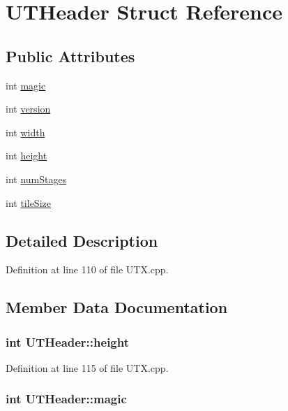 \hypertarget{struct_u_t_header}{
\section{UTHeader Struct Reference}
\label{struct_u_t_header}
}
\subsection*{Public Attributes}
\begin{CompactItemize}
\item 
int \hyperlink{struct_u_t_header_f6c9f55cec2e6ec94620e6e3fc24770e}{magic}
\item 
int \hyperlink{struct_u_t_header_8e3185b7f9941a663f06a879c8d0a0fa}{version}
\item 
int \hyperlink{struct_u_t_header_40fc887172fff3070cc65b89284fd6a2}{width}
\item 
int \hyperlink{struct_u_t_header_76a3dd533173f5658d6541778a633e8e}{height}
\item 
int \hyperlink{struct_u_t_header_59ad5aaff6083f0136dbe7d1875603d2}{numStages}
\item 
int \hyperlink{struct_u_t_header_83e57b185d9c010ed927a4d07c570b33}{tileSize}
\end{CompactItemize}


\subsection{Detailed Description}


Definition at line 110 of file UTX.cpp.

\subsection{Member Data Documentation}
\hypertarget{struct_u_t_header_76a3dd533173f5658d6541778a633e8e}{
\subsubsection[{height}]{\setlength{\rightskip}{0pt plus 5cm}int {\bf UTHeader::height}}}
\label{struct_u_t_header_76a3dd533173f5658d6541778a633e8e}




Definition at line 115 of file UTX.cpp.\hypertarget{struct_u_t_header_f6c9f55cec2e6ec94620e6e3fc24770e}{
\subsubsection[{magic}]{\setlength{\rightskip}{0pt plus 5cm}int {\bf UTHeader::magic}}}
\label{struct_u_t_header_f6c9f55cec2e6ec94620e6e3fc24770e}




